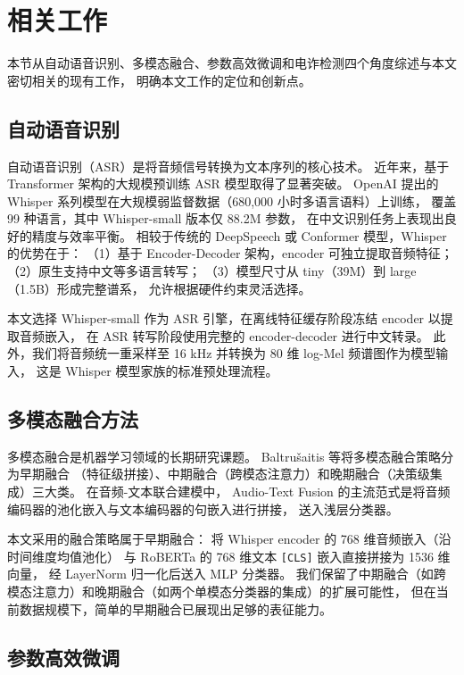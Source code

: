 \documentclass[11pt,a4paper]{ctexart}
\begin{document}
\section{相关工作}

本节从自动语音识别、多模态融合、参数高效微调和电诈检测四个角度综述与本文密切相关的现有工作，
明确本文工作的定位和创新点。

\subsection{自动语音识别}

自动语音识别（ASR）是将音频信号转换为文本序列的核心技术。
近年来，基于 Transformer 架构的大规模预训练 ASR 模型取得了显著突破。
OpenAI 提出的 Whisper 系列模型\cite{whisper}在大规模弱监督数据（680,000 小时多语言语料）上训练，
覆盖 99 种语言，其中 Whisper-small 版本仅 88.2M 参数，
在中文识别任务上表现出良好的精度与效率平衡。
相较于传统的 DeepSpeech 或 Conformer 模型，Whisper 的优势在于：
（1）基于 Encoder-Decoder 架构，encoder 可独立提取音频特征；
（2）原生支持中文等多语言转写；
（3）模型尺寸从 tiny（39M）到 large（1.5B）形成完整谱系，
允许根据硬件约束灵活选择。

本文选择 Whisper-small 作为 ASR 引擎，在离线特征缓存阶段冻结 encoder 以提取音频嵌入，
在 ASR 转写阶段使用完整的 encoder-decoder 进行中文转录。
此外，我们将音频统一重采样至 16 kHz 并转换为 80 维 log-Mel 频谱图作为模型输入，
这是 Whisper 模型家族的标准预处理流程。

\subsection{多模态融合方法}

多模态融合是机器学习领域的长期研究课题。
Baltrušaitis 等\cite{fusion_survey}将多模态融合策略分为早期融合
（特征级拼接）、中期融合（跨模态注意力）和晚期融合（决策级集成）三大类。
在音频-文本联合建模中，
Audio-Text Fusion 的主流范式是将音频编码器的池化嵌入与文本编码器的句嵌入进行拼接，
送入浅层分类器。

本文采用的融合策略属于早期融合：
将 Whisper encoder 的 768 维音频嵌入（沿时间维度均值池化）
与 RoBERTa 的 768 维文本 \texttt{[CLS]} 嵌入直接拼接为 1536 维向量，
经 LayerNorm 归一化后送入 MLP 分类器。
我们保留了中期融合（如跨模态注意力）和晚期融合（如两个单模态分类器的集成）的扩展可能性，
但在当前数据规模下，简单的早期融合已展现出足够的表征能力。

\subsection{参数高效微调}
\end{document}
